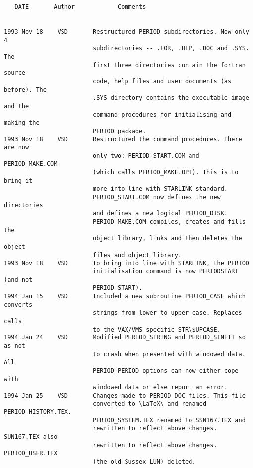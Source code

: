\begin{verbatim}
\end{verbatim}


\newpage

                           
\begin{verbatim}
   DATE       Author            Comments                           

                           
1993 Nov 18    VSD       Restructured PERIOD subdirectories. Now only 4
                         subdirectories -- .FOR, .HLP, .DOC and .SYS. The
                         first three directories contain the fortran source
                         code, help files and user documents (as before). The
                         .SYS directory contains the executable image and the
                         command procedures for initialising and making the 
                         PERIOD package.
1993 Nov 18    VSD       Restructured the command procedures. There are now
                         only two: PERIOD_START.COM and PERIOD_MAKE.COM
                         (which calls PERIOD_MAKE.OPT). This is to bring it
                         more into line with STARLINK standard. 
                         PERIOD_START.COM now defines the new directories 
                         and defines a new logical PERIOD_DISK. 
                         PERIOD_MAKE.COM compiles, creates and fills the 
                         object library, links and then deletes the object 
                         files and object library. 
1993 Nov 18    VSD       To bring into line with STARLINK, the PERIOD 
                         initialisation command is now PERIODSTART (and not
                         PERIOD_START). 
1994 Jan 15    VSD       Included a new subroutine PERIOD_CASE which converts
                         strings from lower to upper case. Replaces calls
                         to the VAX/VMS specific STR\$UPCASE.
1994 Jan 24    VSD       Modified PERIOD_STRING and PERIOD_SINFIT so as not
                         to crash when presented with windowed data. All
                         PERIOD_PERIOD options can now either cope with
                         windowed data or else report an error.
1994 Jan 25    VSD       Changes made to PERIOD_DOC files. This file 
                         converted to \LaTeX\ and renamed PERIOD_HISTORY.TEX.
                         PERIOD_SYSTEM.TEX renamed to SSN167.TEX and
                         rewritten to reflect above changes. SUN167.TEX also
                         rewritten to reflect above changes. PERIOD_USER.TEX
                         (the old Sussex LUN) deleted. 

\end{verbatim}
